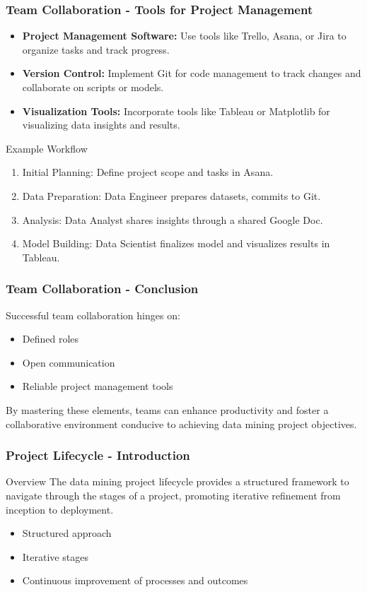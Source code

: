 \documentclass[aspectratio=169]{beamer}
\begin{document}
\begin{frame}[fragile]
    \frametitle{Team Collaboration - Tools for Project Management}
    \begin{itemize}
        \item \textbf{Project Management Software:} Use tools like Trello, Asana, or Jira to organize tasks and track progress.
        \item \textbf{Version Control:} Implement Git for code management to track changes and collaborate on scripts or models.
        \item \textbf{Visualization Tools:} Incorporate tools like Tableau or Matplotlib for visualizing data insights and results.
    \end{itemize}
    \begin{block}{Example Workflow}
    \begin{enumerate}
        \item Initial Planning: Define project scope and tasks in Asana.
        \item Data Preparation: Data Engineer prepares datasets, commits to Git.
        \item Analysis: Data Analyst shares insights through a shared Google Doc.
        \item Model Building: Data Scientist finalizes model and visualizes results in Tableau.
    \end{enumerate}
    \end{block}
\end{frame}

\begin{frame}[fragile]
    \frametitle{Team Collaboration - Conclusion}
    Successful team collaboration hinges on:
    \begin{itemize}
        \item Defined roles
        \item Open communication
        \item Reliable project management tools
    \end{itemize}
    By mastering these elements, teams can enhance productivity and foster a collaborative environment conducive to achieving data mining project objectives.
\end{frame}

\begin{frame}[fragile]
    \frametitle{Project Lifecycle - Introduction}
    \begin{block}{Overview}
        The data mining project lifecycle provides a structured framework to navigate through the stages of a project, promoting iterative refinement from inception to deployment. 
    \end{block}
    \begin{itemize}
        \item Structured approach
        \item Iterative stages
        \item Continuous improvement of processes and outcomes
    \end{itemize}
\end{frame}
\end{document}
